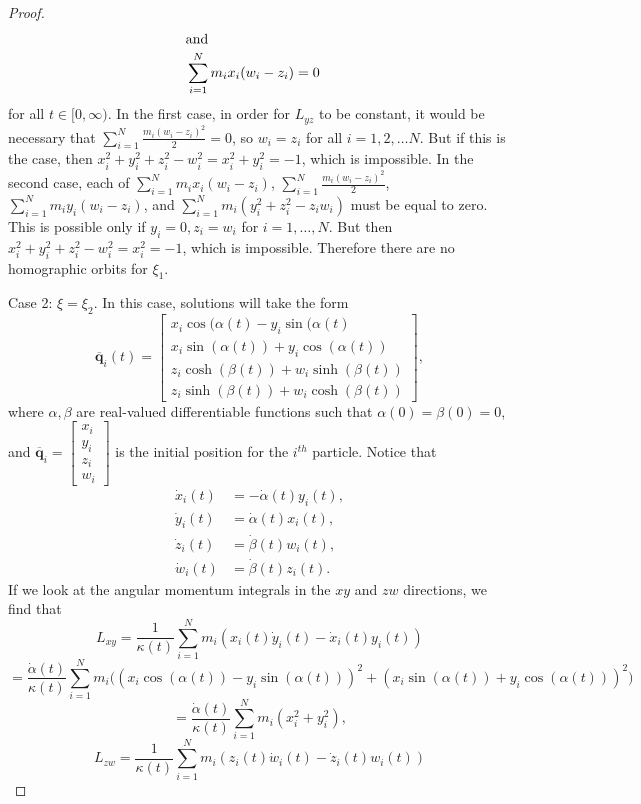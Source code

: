 \documentclass[12pt]{amsart}
\theoremstyle{definition}
\newcommand {\q} {\mathbf{q}}
\begin{document}
{\begin{proof}
\begin{align*}
\intertext{and}
&\sum\limits_{i=1}^Nm_ix_i(w_i-z_i)=0\end{align*}
for all $t \in [0, \infty)$. In the first case, in order for $L_{yz}$ to be constant, it would be necessary that $\sum_{i=1}^N\frac{m_i(w_i-z_i)^2}{2}=0$, so $w_i=z_i$ for all $i=1,2,\ldots N$. But if this is the case, then $x_i^2+y_i^2+z_i^2-w_i^2=x_i^2+y_i^2=-1$, which is impossible. In the second case, each of $\sum_{i=1}^N m_ix_i(w_i-z_i)$, $\sum_{i=1}^N\frac{m_i(w_i-z_i)^2}{2}$, $\sum_{i=1}^N m_iy_i(w_i-z_i)$, and $\sum_{i=1}^N m_i(y_i^2+z_i^2-z_iw_i)$ must be equal to zero. This is possible only if $y_i=0, z_i=w_i$ for $i=1,\ldots, N$. But then $x_i^2+y_i^2+z_i^2-w_i^2=x_i^2=-1$, which is impossible. Therefore there are no homographic orbits for $\xi_1$.
\smallskip

Case 2:  $\xi=\xi_2$. In this case, solutions will take the form $$\overline{\q}_i(t)=\begin{bmatrix}x_i\cos(\alpha(t)-y_i\sin(\alpha(t) \\ x_i \sin(\alpha(t))+y_i\cos(\alpha(t))\\ z_i\cosh(\beta(t))+w_i\sinh(\beta(t))\\ z_i\sinh(\beta(t))+w_i\cosh(\beta(t))\end{bmatrix},$$ where $\alpha, \beta$ are real-valued differentiable functions such that $\alpha(0)=\beta(0)=0$, and $\overline{\q}_i=\begin{bmatrix}x_i\\y_i\\z_i\\w_i\end{bmatrix}$ is the initial position for the $i^{th}$ particle. Notice that \begin{align*}
\dot{x}_i(t)&=-\dot{\alpha}(t)y_i(t),\\
\dot{y}_i(t)&=\dot{\alpha}(t)x_i(t),\\
\dot{z}_i(t)&=\dot{\beta}(t)w_i(t),\\
\dot{w}_i(t)&=\dot{\beta}(t)z_i(t).
\end{align*}
If we look at the angular momentum integrals in the $xy$ and $zw$ directions, we find that 
$$
L_{xy}=\frac{1}{\kappa(t)}\sum\limits_{i=1}^N m_i(x_i(t)\dot{y}_i(t)-\dot{x}_i(t)y_i(t))
$$
$$
=\frac{\dot{\alpha}(t)}{\kappa(t)}\sum\limits_{i=1}^Nm_i \bigl((x_i\cos(\alpha(t))-y_i\sin(\alpha(t)))^2+ (x_i\sin(\alpha(t))+y_i\cos(\alpha(t)))^2\bigr)
$$
$$
=\frac{\dot{\alpha}(t)}{\kappa(t)}\sum\limits_{i=1}^N m_i(x_i^2+y_i^2),
$$
$$
L_{zw}= \frac{1}{\kappa(t)}\sum\limits_{i=1}^N m_i(z_i(t)\dot{w}_i(t)-\dot{z}_i(t)w_i(t))
$$
\end{proof}}
\end{document}

